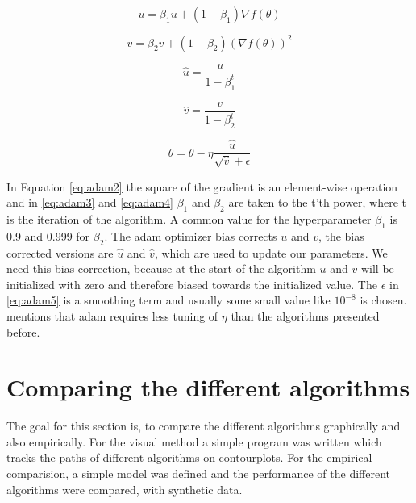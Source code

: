 \documentclass[aodsor,preprint]{imsart}
\numberwithin{equation}{section}
\theoremstyle{plain}
\begin{document}
\begin{equation} \label{eq:adam1}
u = \beta_{1} u + (1-\beta_{1}) \nabla f(\theta)
\end{equation} 

\begin{equation} \label{eq:adam2}
v = \beta_{2} v + (1-\beta_{2}) \left( \nabla f(\theta)\right)^2
\end{equation}

\begin{equation} \label{eq:adam3}
\hat{u} = \frac{u}{1-\beta_{1}^t}
\end{equation} 

\begin{equation} \label{eq:adam4}
\hat{v} = \frac{v}{1-\beta_{2}^t}
\end{equation}

\begin{equation} \label{eq:adam5}
\theta = \theta - \eta \frac{\hat{u}}{\sqrt{\hat{v}} + \epsilon}
\end{equation}

In Equation \ref{eq:adam2} the square of the gradient is an element-wise operation and in \ref{eq:adam3} and \ref{eq:adam4} $\beta_{1}$ and $\beta_{2}$ are taken to the t'th power, where t is the iteration of the algorithm. A common value for the hyperparameter $\beta_{1}$ is 0.9 and 0.999 for $\beta_{2}$. The adam optimizer bias corrects $u$ and $v$, the bias corrected versions are $\hat{u}$ and $\hat{v}$, which are used to update our parameters. We need this bias correction, because at the start of the algorithm $u$ and $v$ will be initialized with zero and therefore biased towards the initialized value.
The $\epsilon$ in \ref{eq:adam5} is a smoothing term and usually some small value like $10^{-8}$ is chosen. \cite{geron2019hands} mentions that adam requires less tuning of $\eta$ than the algorithms presented before.

\section{Comparing the different algorithms}
The goal for this section is, to compare the different algorithms graphically and also empirically. For the visual method a simple program was written which tracks the paths of different algorithms on contourplots. For the empirical comparision, a simple model was defined and the performance of the different algorithms were compared, with synthetic data.
\end{document}
